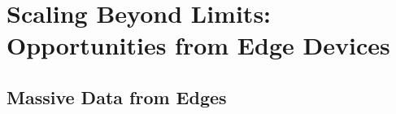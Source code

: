 
\section{Scaling Beyond Limits: Opportunities from Edge Devices}
\label{sec:opportunities}
\subsection{Massive Data from Edges}
\label{subsec:edge_data}


